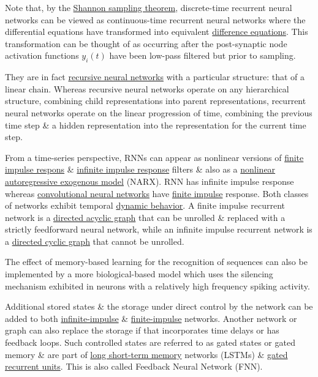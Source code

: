 \documentclass{article}
\begin{document}
\begin{itemize}
	Note that, by the \href{https://en.wikipedia.org/wiki/Shannon_sampling_theorem}{Shannon sampling theorem}, discrete-time recurrent neural networks can be viewed as continuous-time recurrent neural networks where the differential equations have transformed into equivalent \href{https://en.wikipedia.org/wiki/Difference_equation}{difference equations}. This transformation can be thought of as occurring after the post-synaptic node activation functions $y_i(t)$ have been low-pass filtered but prior to sampling.
	
	They are in fact \href{https://en.wikipedia.org/wiki/Recursive_neural_network}{recursive neural networks} with a particular structure: that of a linear chain. Whereas recursive neural networks operate on any hierarchical structure, combining child representations into parent representations, recurrent neural networks operate on the linear progression of time, combining the previous time step \& a hidden representation into the representation for the current time step.
	
	From a time-series perspective, RNNs can appear as nonlinear versions of \href{https://en.wikipedia.org/wiki/Finite_impulse_response}{finite impulse respons} \& \href{https://en.wikipedia.org/wiki/Infinite_impulse_response}{infinite impulse response} filters \& also as a \href{https://en.wikipedia.org/wiki/Nonlinear_autoregressive_exogenous_model}{nonlinear autoregressive exogenous model} (NARX). RNN has infinite impulse response whereas \href{https://en.wikipedia.org/wiki/Convolutional_neural_network}{convolutional neural networks} have \href{https://en.wikipedia.org/wiki/Finite_impulse_response}{finite impulse} response. Both classes of networks exhibit temporal \href{https://en.wikipedia.org/wiki/Dynamic_system}{dynamic behavior}. A finite impulse recurrent network is a \href{https://en.wikipedia.org/wiki/Directed_acyclic_graph}{directed acyclic graph} that can be unrolled \& replaced with a strictly feedforward neural network, while an infinite impulse recurrent network is a \href{https://en.wikipedia.org/wiki/Directed_cyclic_graph}{directed cyclic graph} that cannot be unrolled.
	
	The effect of memory-based learning for the recognition of sequences can also be implemented by a more biological-based model which uses the silencing mechanism exhibited in neurons with a relatively high frequency spiking activity.
	
	Additional stored states \& the storage under direct control by the network can be added to both \href{https://en.wikipedia.org/wiki/Infinite_impulse_response}{infinite-impulse} \& \href{https://en.wikipedia.org/wiki/Finite_impulse_response}{finite-impulse} networks. Another network or graph can also replace the storage if that incorporates time delays or has feedback loops. Such controlled states are referred to as gated states or gated memory \& are part of \href{https://en.wikipedia.org/wiki/Long_short-term_memory}{long short-term memory} networks (LSTMs) \& \href{https://en.wikipedia.org/wiki/Gated_recurrent_unit}{gated recurrent units}. This is also called Feedback Neural Network (FNN).
\end{itemize}
\end{document}
